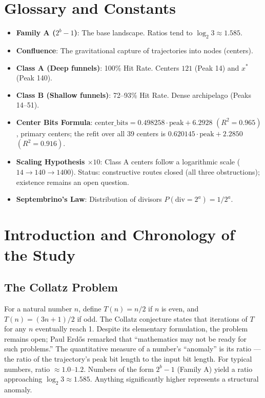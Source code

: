 \documentclass[12pt,a4paper]{article}
\theoremstyle{remark}
\begin{document}
\section*{Glossary and Constants}
\begin{itemize}
\item \textbf{Family A ($2^b - 1$)}: The base landscape. Ratios tend to $\log_2 3 \approx 1.585$.
\item \textbf{Confluence}: The gravitational capture of trajectories into nodes (centers).
\item \textbf{Class A (Deep funnels)}: 100\% Hit Rate. Centers $121$ (Peak 14) and $x^*$ (Peak 140).
\item \textbf{Class B (Shallow funnels)}: 72--93\% Hit Rate. Dense archipelago (Peaks 14--51).
\item \textbf{Center Bits Formula}: $\mathrm{center\_bits} = 0.498258 \cdot \mathrm{peak} + 6.2928$ $(R^2 = 0.965)$, primary centers; the refit over all 39 centers is $0.620145 \cdot \mathrm{peak} + 2.2850$ $(R^2=0.916)$.
\item \textbf{Scaling Hypothesis $\times 10$}: Class A centers follow a logarithmic scale ($14 \to 140 \to 1400$). Status: constructive routes closed (all three obstructions); existence remains an open question.
\item \textbf{Septembrino's Law}: Distribution of divisors $P(\mathrm{div} = 2^a) = 1/2^a$.
\end{itemize}

\section{Introduction and Chronology of the Study}
\subsection{The Collatz Problem}
For a natural number $n$, define $T(n) = n/2$ if $n$ is even, and $T(n) = (3n+1)/2$ if odd. The Collatz conjecture states that iterations of $T$ for any $n$ eventually reach 1. Despite its elementary formulation, the problem remains open; Paul Erd\H{o}s remarked that ``mathematics may not be ready for such problems.''
The quantitative measure of a number's ``anomaly'' is its ratio --- the ratio of the trajectory's peak bit length to the input bit length. For typical numbers, ratio $\approx 1.0$--$1.2$. Numbers of the form $2^b - 1$ (Family A) yield a ratio approaching $\log_2 3 \approx 1.585$. Anything significantly higher represents a structural anomaly.
\end{document}
